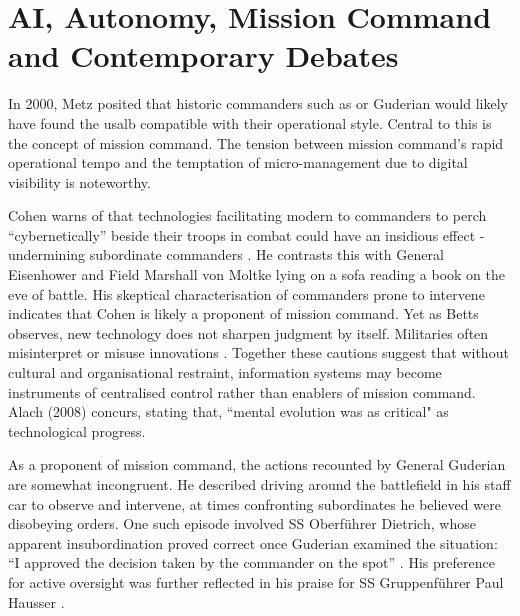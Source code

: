 \section{AI, Autonomy, Mission Command and Contemporary Debates} 
In 2000, Metz  posited that historic commanders such as  or Guderian would likely have found the \gls{usalb} compatible with their operational style\nocite{Metz_2000}. Central to this is the concept of mission command. The tension between mission command's rapid operational tempo and the temptation of micro-management due to digital visibility is noteworthy.

Cohen warns of that technologies facilitating modern to commanders to perch ``cybernetically'' beside their troops in combat could have an insidious effect - undermining subordinate commanders \parencite{COHEN_1996}. He contrasts this with General Eisenhower and Field Marshall von Moltke lying on a sofa reading a book on the eve of battle. His skeptical characterisation of commanders prone to intervene indicates that Cohen is likely a proponent of mission command. Yet as Betts observes, new technology does not sharpen judgment by itself. Militaries often misinterpret or misuse innovations \parencite{BETTS_1996}. Together these cautions suggest that without cultural and organisational restraint, information systems may become instruments of centralised control rather than enablers of mission command. Alach (2008) concurs, stating that, ``mental evolution was as critical" as technological progress\nocite{ALACH_2008}.

As a proponent of mission command, the actions recounted by General Guderian are somewhat incongruent. He described driving around the battlefield in his staff car to observe and intervene, at times confronting subordinates he believed were disobeying orders. One such episode involved SS Oberf\"uhrer  Dietrich, whose apparent insubordination proved correct once Guderian examined the situation: ``I approved the decision taken by the commander on the spot'' \parencite[p.~117]{GUDERIAN_1952}. His preference for active oversight was further reflected in his praise for SS Gruppenf\"uhrer Paul Hausser \parencite[p.~73]{YEIDE_2011}. %

